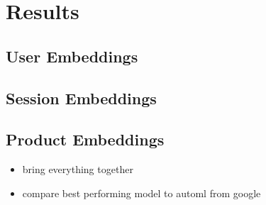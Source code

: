 \chapter{Results}
\section{User Embeddings}
\section{Session Embeddings}
\section{Product Embeddings}
\begin{itemize}
\item bring everything together
\item compare best performing model to automl from google
\end{itemize}